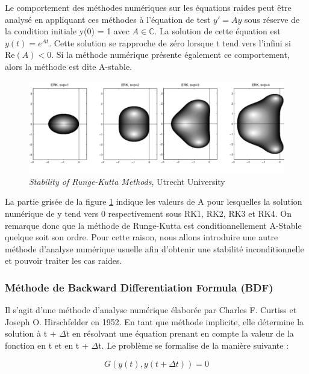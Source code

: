 Le comportement des méthodes numériques sur les équations raides peut être analysé en appliquant ces méthodes à l'équation de test $y' = Ay$ sous réserve de la condition initiale y(0) = 1 avec $A \in \mathbb{C}$. La solution de cette équation est $y (t) = e^{At}$. Cette solution se rapproche de zéro lorsque t tend vers l'infini si $\mathrm{Re}(A)<0$. Si la méthode numérique présente également ce comportement, alors la méthode est dite A-stable.

\begin{figure}[h!]
    \centering
    \includegraphics[width=\textwidth]{images/astab_rk.png}
    \caption{\textit{Stability of Runge-Kutta Methods}, Utrecht University}
\label{fig:astab_rk}
\end{figure}

La partie grisée de la figure \ref{fig:astab_rk} indique les valeurs de A pour lesquelles la solution numérique de y tend vers 0 respectivement sous RK1, RK2, RK3 et RK4. On remarque donc que la méthode de Runge-Kutta est conditionnellement A-Stable quelque soit son ordre. Pour cette raison, nous allons introduire une autre méthode d'analyse numérique usuelle afin d'obtenir une stabilité inconditionnelle et pouvoir traiter les cas raides.

\subsubsection{Méthode de Backward Differentiation Formula (BDF)}

Il s'agit d'une méthode d'analyse numérique élaborée par Charles F. Curtiss et Joseph O. Hirschfelder en 1952.
En tant que méthode implicite, elle détermine la solution à t +  $\Delta$t en résolvant une équation prenant en compte la valeur de la fonction en t et en t +  $\Delta$t. Le problème se formalise de la manière suivante : 

\begin{equation}
    G(y(t), y(t+\Delta t)) = 0
\end{equation}

